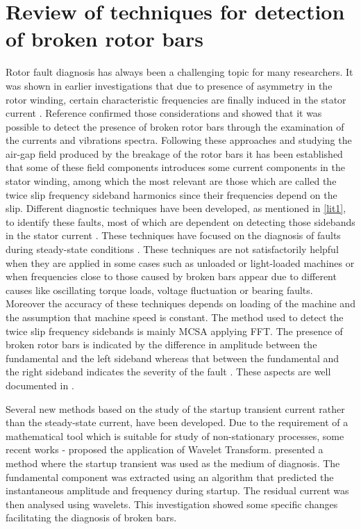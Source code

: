 \documentclass[a4paper,11pt]{report}
\begin{document}
\section{Review of techniques for detection of broken rotor bars}
Rotor fault diagnosis has always been a challenging topic for many researchers. It was shown in earlier investigations that due to presence of asymmetry in the rotor winding, certain characteristic frequencies are finally induced in the stator current \cite{stavrou}. Reference \cite{hargis} confirmed those considerations and showed that it was possible to detect the presence of broken rotor bars through the examination of the currents and vibrations spectra. Following these approaches and studying the air-gap field produced by the breakage of the rotor bars it has been established that some of these field components introduces some current components in the stator winding, among which the most relevant are those which are called the twice slip frequency sideband harmonics since their frequencies depend on the slip. Different diagnostic techniques have been developed, as mentioned in \ref{lit1}, to identify these faults, most of which are dependent on detecting those sidebands in the stator current \cite{hargis}. These techniques have focused on the diagnosis of faults during steady-state conditions \cite{kliman}. These techniques are not satisfactorily helpful when they are applied in some cases such as unloaded or light-loaded machines or when frequencies close to those caused by broken bars appear due to different causes like oscillating torque loads, voltage fluctuation or bearing faults. Moreover the accuracy of these techniques depends on loading of the machine and the assumption that machine speed is constant. The method used to detect the twice slip frequency sidebands is mainly MCSA applying FFT. The presence of broken rotor bars is indicated by the difference in amplitude between the fundamental and the left sideband whereas that between the fundamental and the right sideband indicates the severity of the fault \cite{hargis}. These aspects are well documented in \cite{00873206}.

Several new methods based on the study of the startup transient current rather than the steady-state current, have been developed. Due to the requirement of a mathematical tool which is suitable for study of non-stationary processes, some recent works \cite{zhang}-\cite{antonino} proposed the application of Wavelet Transform. 
\cite{01210345} presented a method where the startup transient was used as the medium of diagnosis. The fundamental component was extracted using an algorithm that predicted the instantaneous amplitude and frequency during startup. The residual current was then analysed using wavelets. This investigation showed some specific changes facilitating the diagnosis of broken bars. 
\end{document}
